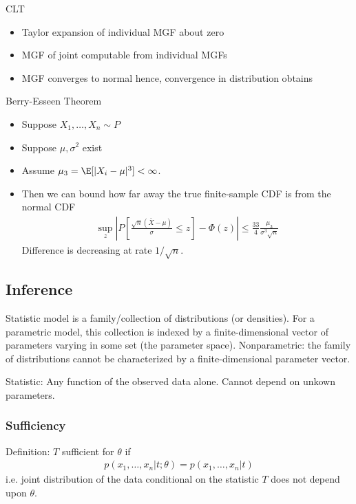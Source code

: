 \documentclass[12pt]{article}
\theoremstyle{plain}
\theoremstyle{definition}
\theoremstyle{remark}
\begin{document}
CLT
\begin{itemize}
  \item Taylor expansion of individual MGF about zero
  \item MGF of joint computable from individual MGFs
  \item MGF converges to normal hence, convergence in distribution
    obtains
\end{itemize}
Berry-Esseen Theorem
\begin{itemize}
  \item Suppose $X_1,\ldots,X_n\sim P$
  \item Suppose $\mu,\sigma^2$ exist
  \item Assume $\mu_3=\E[|X_i-\mu|^3]<\infty$.
  \item Then we can bound how far away the true finite-sample CDF is
    from the normal CDF
    \begin{align*}
      \sup_z
      \left\lvert
      P\left[
        \frac{\sqrt{n}(\bar{X}-\mu)}{\sigma}
        \leq
        z
      \right]
      -
      \Phi(z)
      \right\rvert
      \leq
      \frac{33}{4}
      \frac{\mu_3}{\sigma^3\sqrt{n}}
    \end{align*}
    Difference is decreasing at rate $1/\sqrt{n}$.
\end{itemize}



\subsection{Inference}

Statistic model is a family/collection of distributions (or densities).
For a parametric model, this collection is indexed by a
finite-dimensional vector of parameters varying in some set (the
parameter space).
Nonparametric: the family of distributions cannot be characterized by a
finite-dimensional parameter vector.

Statistic: Any function of the observed data alone.
Cannot depend on unkown parameters.



\subsubsection{Sufficiency}

Definition:
$T$ sufficient for $\theta$ if
\begin{align*}
  p(x_1,\ldots,x_n|t;\theta)
  =
  p(x_1,\ldots,x_n|t)
\end{align*}
i.e. joint distribution of the data conditional on the statistic $T$
does not depend upon $\theta$.
\end{document}

